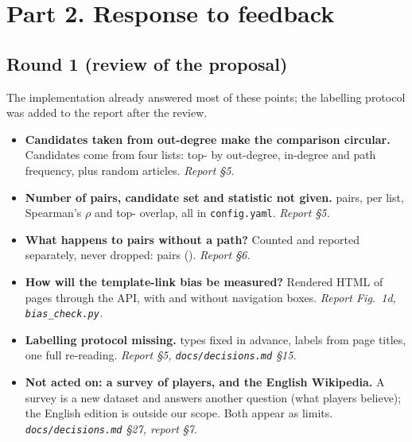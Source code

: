 \documentclass[10pt,a4paper]{article}
\newcommand{\fb}[3]{\item \textbf{#1} #2 \emph{#3}}
\begin{document}
\section*{Part 2. Response to feedback}

\subsection*{Round 1 (review of the proposal)}
The implementation already answered most of these points; the labelling protocol was added to the
report after the review.
\begin{itemize}
\fb{Candidates taken from out-degree make the comparison circular.}{Candidates come from four
lists: top-\TopK{} by out-degree, in-degree and path frequency, plus \NRandomBaseline{} random
articles.}{Report §5.}
\fb{Number of pairs, candidate set and statistic not given.}{\NPairs{} pairs, \TopK{} per list,
Spearman's $\rho$ and top-\TopOverlapK{} overlap, all in \texttt{config.yaml}.}{Report §5.}
\fb{What happens to pairs without a path?}{Counted and reported separately, never dropped:
\NUnreachable{} pairs (\ShareUnreachable).}{Report §6.}
\fb{How will the template-link bias be measured?}{Rendered HTML of \BiasNPages{} pages through the
API, with and without navigation boxes.}{Report Fig.~1d, \texttt{bias\_check.py}.}
\fb{Labelling protocol missing.}{\NTypeLabels{} types fixed in advance, labels from page titles,
one full re-reading.}{Report §5, \texttt{docs/decisions.md} §15.}
\fb{Not acted on: a survey of players, and the English Wikipedia.}{A survey is a new dataset and
answers another question (what players believe); the English edition is outside our scope. Both
appear as limits.}{\texttt{docs/decisions.md} §27, report §7.}
\end{itemize}
\end{document}
